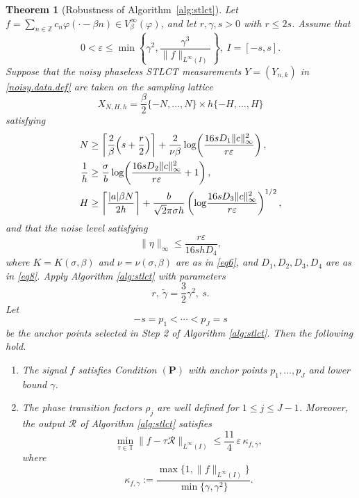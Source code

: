 \documentclass[11pt, reqno]{amsart}
\newtheorem{theorem}{Theorem}[section]
\numberwithin{equation}{section}
\begin{document}
\begin{theorem}[Robustness of Algorithm~\ref{alg:stlct}]\label{alg-stability.thm}
Let $f=\sum_{n\in\mathbb Z}c_n\varphi(\cdot-\beta n)\in V_\beta^\infty(\varphi)$,  
and let $r,\gamma,s>0$ with $r\le 2s$. Assume that
\begin{equation}\label{local.error.def.eq1}
0<\varepsilon \le \min\left\{\gamma^2,\frac{\gamma^3}{\|f\|_{L^\infty(I)}}\right\}, \ I=[-s, s].\end{equation}  
Suppose that the noisy phaseless STLCT measurements $Y=(Y_{n,k})$ in \eqref{noisy.data.def} are taken on the sampling lattice 
$$X_{N,H,h}=\frac{\beta}{2}\{-N,\dots,N\}\times h\{-H,\dots,H\}$$
satisfying 
\begin{align}
N &\ge \left\lceil \frac{2}{\beta}\Bigl(s+\frac{r}{2}\Bigr)\right\rceil
+\frac{2}{\nu\beta}\log\!\left(\frac{16sD_1\|c\|_\infty^2}{r\varepsilon}\right), \label{cond.N}\\
\frac{1}{h} &\ge \frac{\sigma}{b}\log\!\left(\frac{16sD_2\|c\|_\infty^2}{r\varepsilon}+1\right), \label{cond.h}\\
H &\ge \left\lceil \frac{|a|\beta N}{2h}\right\rceil
+\frac{b}{\sqrt{2}\pi\sigma h}
\left(\log\!\frac{16sD_3\|c\|_\infty^2}{r\varepsilon}\right)^{1/2}, \label{cond.H}
\end{align}
and that the noise level satisfying 
\begin{equation}\label{cond.eta}
\|\eta\|_\infty \le \frac{r\varepsilon}{16shD_4},
\end{equation}
where $K=K(\sigma,\beta)$ and $\nu=\nu(\sigma,\beta)$ are as in \eqref{eq6}, and $D_1, D_2, D_3, D_4$ are as in \eqref{eq8}. Apply  Algorithm \ref{alg:stlct}  with  parameters $$
r, \ \tilde\gamma=\frac{3}{2}\gamma^2, \  s.$$  Let $$ -s=p_1<\cdots<p_J=s$$
be the anchor points  selected in Step 2 of Algorithm \ref{alg:stlct}. 
Then the following hold.
\begin{enumerate}

\item
The signal $f$ satisfies Condition $(\mathbf P)$ with anchor points
$p_1,\ldots,p_J$ and lower bound $\gamma$.

\item
The phase transition factors $\rho_j$ are well defined for
$1\le j\le J-1$. Moreover, the output $\mathcal R$ of
Algorithm \ref{alg:stlct} satisfies
\begin{equation}\label{alg.robust.thm.eq2}
\min_{\tau\in\mathbb T} \|f-\tau\mathcal R\|_{L^\infty(I)}
\le\frac{11}{4}\,\varepsilon\,\kappa_{f,\gamma},
\end{equation}
where
$$ \kappa_{f,\gamma} :=\frac{\max\{1,\|f\|_{L^\infty(I)}\}}{\min\{\gamma,\gamma^2\}}.$$
\end{enumerate}
\end{theorem}
\end{document}
